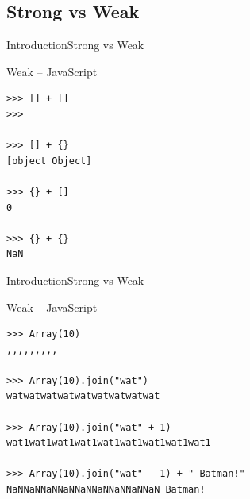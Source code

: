 \documentclass[10pt]{beamer}
\begin{document}
\subsection{Strong vs Weak}


\begin{frame}[fragile]{Introduction}{Strong vs Weak}
\begin{center}
	
\begin{block}{Weak -- JavaScript}
	
\begin{lstlisting}
>>> [] + []  
>>>

>>> [] + {} 
[object Object]

>>> {} + []  
0

>>> {} + {}  
NaN
\end{lstlisting}


\end{block}

\end{center}

\end{frame}


\begin{frame}[fragile]{Introduction}{Strong vs Weak}
\begin{center}
		
\begin{block}{Weak -- JavaScript}
			
\begin{lstlisting}
>>> Array(10)
,,,,,,,,,

>>> Array(10).join("wat")
watwatwatwatwatwatwatwatwat

>>> Array(10).join("wat" + 1)
wat1wat1wat1wat1wat1wat1wat1wat1wat1

>>> Array(10).join("wat" - 1) + " Batman!"      
NaNNaNNaNNaNNaNNaNNaNNaNNaN Batman!
\end{lstlisting}
			
			
\end{block}
		
\end{center}
	
\end{frame}
\end{document}
